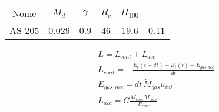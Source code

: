 \begin{workout}
	\begin{table}[!ht]
		\begin{tabular}{|cccccc|}
			Nome&$M_d$&$\gamma$&$R_c$&$H_{100}$&\\
			AS 205&0.029&0.9&46&19.6&0.11\\
		\end{tabular}
	\end{table}
\end{workout}


\begin{workout}
	\begin{align}
		&L=L_{cont}+L_{acc}\\
		&L_{cont}=-\frac{E_t(t+dt)-E_t(t)-E_{gas,acc}}{dt}\\
		&E_{gas,acc}=dt\,\dot{M}_{gas}u_{int}\\
		&L_{acc}=G\frac{\dot{M}_{core}M_{core}}{R_{core}}
	\end{align}
\end{workout}

